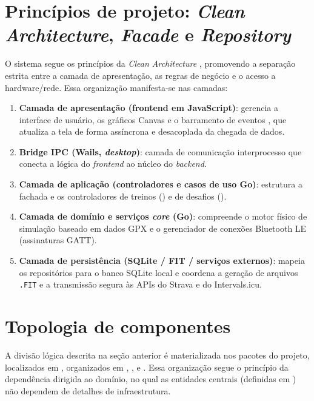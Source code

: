 \section{Princípios de projeto: \textit{Clean Architecture}, \textit{Facade} e \textit{Repository}}
\label{sec:principios}

O sistema segue os princípios da \textit{Clean Architecture}
\cite{martin2017clean}, promovendo a separação estrita entre a camada de
apresentação, as regras de negócio e o acesso a hardware/rede. Essa organização
manifesta-se nas camadas:

\begin{enumerate}
    \item \textbf{Camada de apresentação (frontend em JavaScript)}: gerencia a
        interface de usuário, os gráficos Canvas e o barramento de eventos
        , que atualiza a tela de forma assíncrona e
        desacoplada da chegada de dados.
    \item \textbf{Bridge IPC (Wails, \textit{desktop})}: camada de comunicação
        interprocesso que conecta a lógica do \textit{frontend} ao núcleo do
        \textit{backend}.
    \item \textbf{Camada de aplicação (controladores e casos de uso Go)}:
        estrutura a fachada  e os controladores de treinos
        () e de desafios ().
    \item \textbf{Camada de domínio e serviços \textit{core} (Go)}: compreende
        o motor físico de simulação baseado em dados GPX e o gerenciador de
        conexões Bluetooth LE (assinaturas GATT).
    \item \textbf{Camada de persistência (SQLite / FIT / serviços externos)}:
        mapeia os repositórios para o banco SQLite local e coordena a geração
        de arquivos \texttt{.FIT} e a transmissão segura às APIs do Strava e do
        Intervals.icu.
\end{enumerate}

\section{Topologia de componentes}
\label{sec:topologia}

A divisão lógica descrita na seção anterior é materializada nos pacotes do
projeto, localizados em , organizados em ,
,  e . Essa organização segue o
princípio da dependência dirigida ao domínio, no qual as entidades centrais
(definidas em ) não dependem de detalhes de
infraestrutura.


